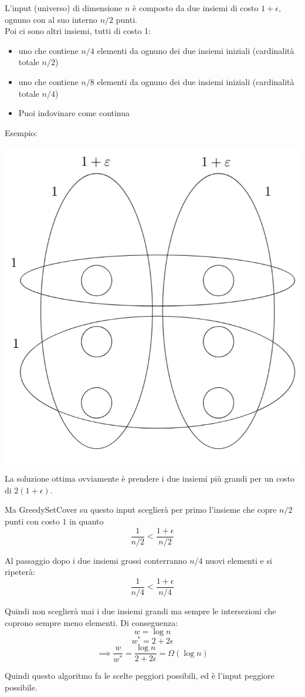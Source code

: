 \documentclass[11pt]{article}
\begin{document}
	L'input (universo) di dimensione $n$ è composto da due insiemi di costo $1 + \epsilon$, ognuno con al suo interno $n/2$ punti. \\
	Poi ci sono altri insiemi, tutti di costo 1:
	\begin{itemize}
		\item uno che contiene $n/4$ elementi da ognuno dei due insiemi iniziali (cardinalità totale $n/2$)
		\item uno che contiene $n/8$ elementi da ognuno dei due insiemi iniziali (cardinalità totale $n/4$)
		\item Puoi indovinare come continua
	\end{itemize}
	Esempio:
	
	\begin{center}
		\includegraphics[width=0.5\columnwidth]{img/VertexCoverInput}
	\end{center}
	
	La soluzione ottima ovviamente è prendere i due insiemi più grandi per un costo di $2(1 + \epsilon)$.\\
	
	\newpage
	
	Ma GreedySetCover su questo input sceglierà per primo l'insieme che copre $n/2$ punti con costo $1$ in quanto 
	$$ \frac{1}{n/2} < \frac{1+\epsilon}{n/2} $$
	
	Al passaggio dopo i due insiemi grossi conterranno $n/4$ nuovi elementi e si ripeterà:
	$$ \frac{1}{n/4} < \frac{1+\epsilon}{n/4} $$
	
	Quindi non sceglierà mai i due insiemi grandi ma sempre le intersezioni che coprono sempre meno elementi. Di conseguenza:
	$$ w = \log n $$
	$$ w^\ast = 2 + 2 \epsilon$$
	$$ \implies \frac{w}{w^\ast} = \frac{\log n}{2 + 2 \epsilon} = \Omega (\log n)$$
	
	Quindi questo algoritmo fa le scelte peggiori possibili, ed è l'input peggiore possibile.\\
	
\end{document}
